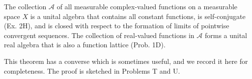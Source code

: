 The collection $\mathcal{A}$ of all measurable complex-valued functions on a measurable space $X$ is a unital algebra that contains all constant functions, is self-conjugate (Ex. 2H), and is closed with respect to the formation of limits of pointwise convergent sequences. The collection of real-valued functions in $\mathcal{A}$ forms a unital real algebra that is also a function lattice (Prob. 1D).

This theorem has a converse which is sometimes useful, and we record it here for completeness. The proof is sketched in Problems T and U.

